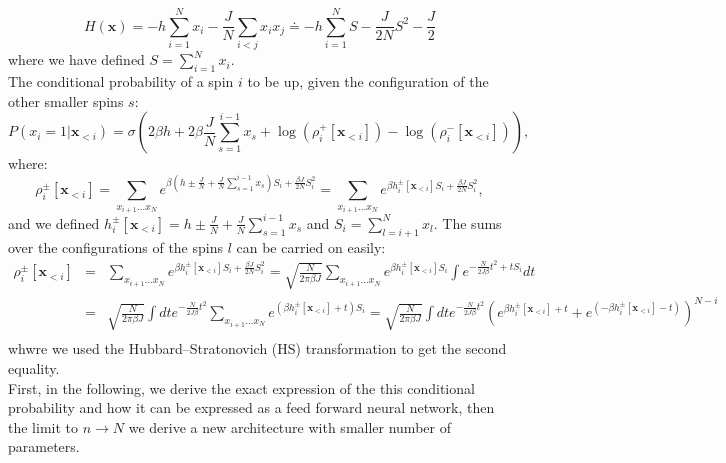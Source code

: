 \documentclass{article}
\begin{document}
\begin{equation}
H\left(\mathbf{x}\right)=-h\sum_{i=1}^{N}x_{i}-\frac{J}{N}\sum_{i<j}x_{i}x_{j}
\doteq -h\sum_{i=1}^{N} S - \frac{J}{2N}S^2 - \frac{J}{2}
\end{equation}
 where we have defined $S=\sum_{i=1}^{N}x_{i}$.\\
 The conditional probability of a spin $i$ to be up, given the configuration of the other smaller spins $s$:
\begin{equation}
P\left(x_{i}=1|\mathbf{x}_{<i}\right) = \sigma\left( 
 2 \beta h + 2 \beta \frac{J}{N}\sum_{s=1}^{i-1}x_s +\log(\rho_i^+[\mathbf{x}_{<i}]) - \log(\rho_i^-[\mathbf{x}_{<i}])
\right),
\end{equation}
where:
\begin{equation*}
\rho_i^{\pm}[\mathbf{x}_{<i}] = \sum_{x_{i+1}\dots 
x_{N}}e^{\beta \left(h\pm\frac{J}{N}+\frac{J}{N}\sum_{s=1}^{i-1}x_{s}\right)S_{i}+\frac{\beta J}{2N}S_{i}^{2}} = 
\sum_{x_{i+1}\dots x_{N}} e^{\beta h_i^{\pm}[\mathbf{x}_{<i}]S_i +\frac{\beta J}{2N}S_{i}^{2}},
\end{equation*}
and we defined $h_i^{\pm}[\mathbf{x}_{<i}] = h\pm\frac{J}{N}+\frac{J}{N}\sum_{s=1}^{i-1}x_{s}$ and $S_i=\sum_{l=i+1}^{N}x_{l}$. The sums over the configurations of the spins $l$ can be carried on easily:
\begin{eqnarray*}
 \rho_i^{\pm}[\mathbf{x}_{<i}] & = & \sum_{x_{i+1}\dots x_{N}} e^{\beta h_i^{\pm}[\mathbf{x}_{<i}]S_i +\frac{\beta J}{2N}S_{i}^{2}}
  = \sqrt{\frac{N}{2\pi \beta J}}\sum_{x_{i+1}\dots x_{N}}e^{\beta h_i^{\pm}[\mathbf{x}_{<i}] S_{i}}\int e^{-\frac{N}{2J \beta}t^{2}+t S_{i}} dt\\
 & = & \sqrt{\frac{N}{2\pi \beta J}}\int dt e^{-\frac{N}{2J \beta}t^{2}} \sum_{x_{i+1}\dots x_{N}}e^{(\beta h_i^{\pm}[\mathbf{x}_{<i}] + t) S_{i}}  
 =  \sqrt{\frac{N}{2\pi \beta J}}\int dt e^{-\frac{N}{2J \beta}t^{2}} \left(e^{\beta h_i^{\pm}[\mathbf{x}_{<i}] + t} + e^{ (-\beta h_i^{\pm}[\mathbf{x}_{<i}] - t)} \right)^{N-i}  \\ 
 \label{eq:rho_last_exact}
 \end{eqnarray*} 
 whwre we used the Hubbard–Stratonovich (HS) transformation to get the second equality.\\
 First, in the following,  we derive the exact expression of the this conditional probability and how it can be expressed as a feed forward neural network, then the limit to $n\rightarrow N$ we derive a new architecture with smaller number of parameters.\\
\end{document}

